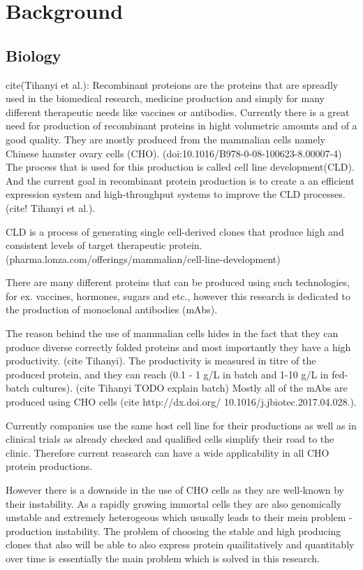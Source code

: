 \section{Background}
\subsection{Biology}
cite(Tihanyi et al.):
Recombinant proteions are the proteins that are spreadly used in the biomedical research, medicine production and simply for many different therapeutic needs like vaccines or antibodies. Currently there is a great need for production of recombinant proteins in hight volumetric amounts and of a good quality. They are mostly produced from the mammalian cells namely Chinese hamster ovary cells (CHO). (doi:10.1016/B978-0-08-100623-8.00007-4) The process that is used for this production is called cell line development(CLD). And the current goal in recombinant protein production is to create a an efficient expression system and high-throughput systems to improve the CLD processes. (cite! Tihanyi et al.). 

CLD is a process of generating single cell-derived clones that produce high and consistent levels of target therapeutic protein. (pharma.lonza.com/offerings/mammalian/cell-line-development)


There are many different proteins that can be produced using such technologies, for ex. vaccines, hormones, sugars and etc., however this research is dedicated to the production of monoclonal antibodies (mAbs). 

The reason behind the use of mammalian cells hides in the fact that they can produce diverse correctly folded proteins and most importantly they have a high productivity. (cite Tihanyi). The productivity is measured in titre of the produced protein, and they can reach (0.1 - 1 g/L in batch and 1-10 g/L in fed-batch cultures). (cite Tihanyi TODO explain batch) Mostly all of the mAbs are produced using CHO cells (cite http://dx.doi.org/ 10.1016/j.jbiotec.2017.04.028.).

Currently companies use the same host cell line for their productions as well as in clinical trials as already checked and qualified cells simplify their road to the clinic. Therefore current reasearch can have a wide applicability in all CHO protein productions.

However there is a downside in the use of CHO cells as they are well-known by their instability. As a rapidly growing immortal cells they are also genomically unstable and extremely heterogeous which ususally leads to their mein problem - production instability. The problem of choosing the stable and high producing clones that also will be able to also express protein quailitatively and quantitably over time is essentially the main problem which is solved in this research.

